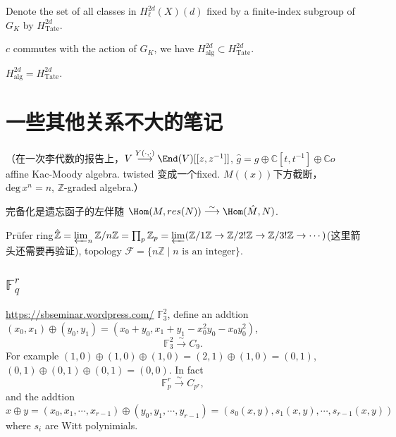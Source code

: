 Denote the set of all classes in $H_\ell^{2d}(X)(d)$ fixed by a finite-index subgroup of $G_K$ by $H_{\text{Tate}}^{2d}$.
\begin{theorem}
	$c$ commutes with the action of $G_K$, we have $H_{\text{alg}}^{2d}\subset H_{\text{Tate}}^{2d}$.
\end{theorem}
\begin{conjecture}
	$H_{\text{alg}}^{2d}= H_{\text{Tate}}^{2d}$.
\end{conjecture}















































\section{一些其他关系不大的笔记}
（在一次李代数的报告上，$V\overset{Y(\cdot,\cdot)}\longrightarrow \End(V)[[z,z^{-1}]]$, $\hat{g}=g\oplus \mathbb{C}[t,t^{-1}]\oplus \mathbb{C}o$ affine Kac-Moody algebra. twisted 变成一个fixed. $M((x))$下方截断，$\mathrm{deg}\, x^n =n$, $\mathbb{Z}$-graded algebra.）

完备化是遗忘函子的左伴随
$\Hom (M,res(N))\overset{\sim}\longrightarrow \Hom (\hat{M},N)$.

Pr\"{u}fer ring$\hat{\mathbb{Z}}=\varprojlim_n \mathbb{Z}/n\mathbb{Z}=\prod_p \mathbb{Z}_p=\varprojlim(\mathbb{Z}/1\mathbb{Z} \to \mathbb{Z}/2!\mathbb{Z} \to\mathbb{Z}/3!\mathbb{Z}\to\cdots)$(这里箭头还需要再验证), topology $\mathcal{F}=\{n\mathbb{Z} \mid n \text{ is an integer}\}$.

\subsection{$\mathbb{F}_q^r$}
\url{https://sbseminar.wordpress.com/}
$\mathbb{F}_3^2$, define an addtion $(x_0,x_1)\oplus (y_0,y_1)=(x_0+y_0,x_1+y_1-x_0^2y_0-x_0y_0^2)$,
\[\mathbb{F}_3^2 \overset{\sim}\longrightarrow C_9.\]
For example $(1,0)\oplus (1,0)\oplus (1,0)=(2,1)\oplus (1,0) =(0,1)$, $(0,1)\oplus (0,1) \oplus(0,1)=(0,0)$. In fact 
\[\mathbb{F}_p^r \overset{\sim}\longrightarrow C_{p^r},\]
and the addtion $x\oplus y =(x_0,x_1,\cdots,x_{r-1})\oplus (y_0,y_1,\cdots,y_{r-1})=(s_0(x,y),s_1(x,y),\cdots,s_{r-1}(x,y))$ where $s_i$ are Witt polynimials.

